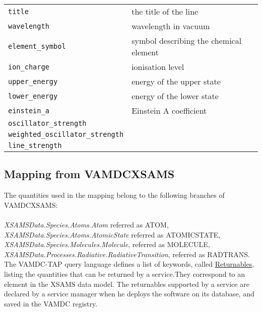 \documentclass[11pt,a4paper]{ivoa}
\begin{document}
\begin{table}[H]
\begin{center}
\begin{tabular}{l l}%
\texttt{title} & the title of the line \\
\texttt{wavelength} & wavelength in vacuum \\
\texttt{element\_symbol} & symbol describing the chemical element \\
\texttt{ion\_charge} & ionisation level\\
\texttt{upper\_energy} & energy of the upper state \\
\texttt{lower\_energy} & energy of the lower state\\
\texttt{einstein\_a} & Einstein A coefficient\\
\texttt{oscillator\_strength} & \\
\texttt{weighted\_oscillator\_strength} & \\
\texttt{line\_strength} &

\end{tabular}

\end{center}
\end{table}

\subsection{Mapping from VAMDCXSAMS}

The quantities used in the mapping belong to the following branches of VAMDCXSAMS:\\\\
\textit{XSAMSData.Species.Atoms.Atom}  referred as ATOM,\\
\textit{XSAMSData.Species.Atoms.AtomicState}  referred as ATOMICSTATE,\\
\textit{XSAMSData.Species.Molecules.Molecule}, referred as MOLECULE,\\
\textit{XSAMSData.Processes.Radiative.RadiativeTransition}, referred as RADTRANS.\\

The VAMDC-TAP query language defines a list of keywords, called \href{https://standards.vamdc.eu/dictionary/returnables.html}{Returnables}, listing the quantities that can be returned by a service.They correspond to an element in the XSAMS data model. The returnables supported by a service are declared by a service manager when he deploys the software on its database, and saved in the VAMDC registry. \\
\end{document}

